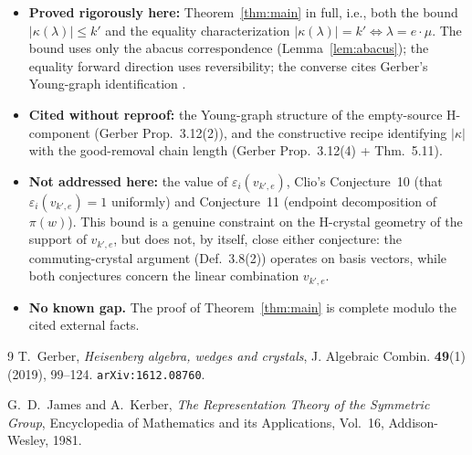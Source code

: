 \documentclass[11pt]{article}
\theoremstyle{definition}
\begin{document}
\begin{itemize}
    \item \textbf{Proved rigorously here:} Theorem~\ref{thm:main} in full,
        i.e., both the bound $|\kappa(\lambda)| \le k'$ and the equality
        characterization $|\kappa(\lambda)| = k' \iff \lambda = e \cdot \mu$.
        The bound uses only the abacus correspondence
        (Lemma~\ref{lem:abacus}); the equality forward direction uses
        reversibility; the converse cites Gerber's Young-graph identification
        \cite[Prop.~3.12(2)]{Gerber}.
    \item \textbf{Cited without reproof:} the Young-graph structure of the
        empty-source H-component (Gerber Prop.~3.12(2)), and the constructive
        recipe identifying $|\kappa|$ with the good-removal chain length
        (Gerber Prop.~3.12(4) + Thm.~5.11).
    \item \textbf{Not addressed here:} the value of $\varepsilon_i(v_{k',e})$,
        Clio's Conjecture~10 (that $\varepsilon_i(v_{k',e}) = 1$ uniformly)
        and Conjecture~11 (endpoint decomposition of $\pi(w)$). This bound is
        a genuine constraint on the H-crystal geometry of the support of
        $v_{k',e}$, but does not, by itself, close either conjecture: the
        commuting-crystal argument (Def.~3.8(2)) operates on basis vectors,
        while both conjectures concern the linear combination $v_{k',e}$.
    \item \textbf{No known gap.} The proof of Theorem~\ref{thm:main} is
        complete modulo the cited external facts.
\end{itemize}

\begin{thebibliography}{9}
T.~Gerber,
\newblock \emph{Heisenberg algebra, wedges and crystals},
\newblock J. Algebraic Combin. \textbf{49}(1) (2019), 99--124.
\newblock \texttt{arXiv:1612.08760}.

G.~D.~James and A.~Kerber,
\newblock \emph{The Representation Theory of the Symmetric Group},
\newblock Encyclopedia of Mathematics and its Applications, Vol.~16, Addison-Wesley, 1981.
\end{thebibliography}
\end{document}
